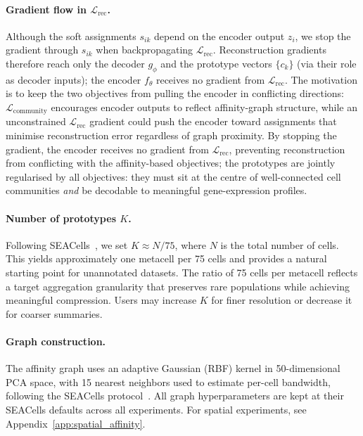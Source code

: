 \paragraph{Gradient flow in $\mathcal{L}_{\text{rec}}$.}
Although the soft assignments $s_{ik}$ depend on the encoder output $z_i$, we stop the gradient through $s_{ik}$ when backpropagating $\mathcal{L}_{\text{rec}}$.
Reconstruction gradients therefore reach only the decoder $g_\phi$ and the prototype vectors $\{c_k\}$ (via their role as decoder inputs); the encoder $f_\theta$ receives no gradient from $\mathcal{L}_{\text{rec}}$.
The motivation is to keep the two objectives from pulling the encoder in conflicting directions: $\mathcal{L}_{\text{community}}$ encourages encoder outputs to reflect affinity-graph structure, while an unconstrained $\mathcal{L}_{\text{rec}}$ gradient could push the encoder toward assignments that minimise reconstruction error regardless of graph proximity.
By stopping the gradient, the encoder receives no gradient from $\mathcal{L}_{\text{rec}}$, preventing reconstruction from conflicting with the affinity-based objectives; the prototypes are jointly regularised by all objectives: they must sit at the centre of well-connected cell communities \emph{and} be decodable to meaningful gene-expression profiles.

\paragraph{Number of prototypes $K$.}
Following SEACells~\citep{seacells}, we set $K \approx N / 75$, where $N$ is the total number of cells.
This yields approximately one metacell per 75 cells and provides a natural starting point for unannotated datasets.
The ratio of 75 cells per metacell reflects a target aggregation granularity that preserves rare populations while achieving meaningful compression.
Users may increase $K$ for finer resolution or decrease it for coarser summaries.

\paragraph{Graph construction.}
The affinity graph uses an adaptive Gaussian (RBF) kernel in 50-dimensional PCA space, with 15 nearest neighbors used to estimate per-cell bandwidth, following the SEACells protocol~\citep{seacells}.
All graph hyperparameters are kept at their SEACells defaults across all experiments.
For spatial experiments, see Appendix~\ref{app:spatial_affinity}.

